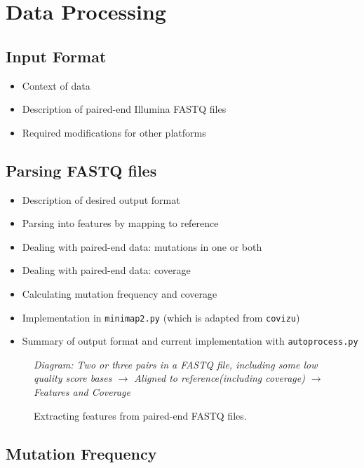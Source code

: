\documentclass{article}
\newenvironment{tightemize}
{ \begin{itemize}
    \setlength{\itemsep}{0pt}
    \setlength{\parskip}{0pt}
    \setlength{\parsep}{0pt}     }
{ \end{itemize}                  }
\begin{document}
\section{Data Processing}

\subsection{Input Format}

\begin{tightemize}
    \item Context of data
    \item Description of paired-end Illumina FASTQ files 
    \item Required modifications for other platforms
\end{tightemize}

\subsection{Parsing FASTQ files}

\begin{tightemize}
    \item Description of desired output format
    \item Parsing into features by mapping to reference
    \item Dealing with paired-end data: mutations in one or both
    \item Dealing with paired-end data: coverage
    \item Calculating mutation frequency and coverage
    \item Implementation in \texttt{minimap2.py} (which is adapted from \texttt{covizu})
    \item Summary of output format and current implementation with \texttt{autoprocess.py}
\end{tightemize}

\begin{figure}[ht!]
\vspace{2cm}
\centering
\emph{Diagram: Two or three pairs in a FASTQ file, including some low quality score bases $\rightarrow$ Aligned to reference(including coverage) $\rightarrow$ Features and Coverage}
\vspace{2cm}
\caption{Extracting features from paired-end FASTQ files.}
\label{fig:feature_diagram}
\end{figure}

\subsection{Mutation Frequency}
\end{document}
